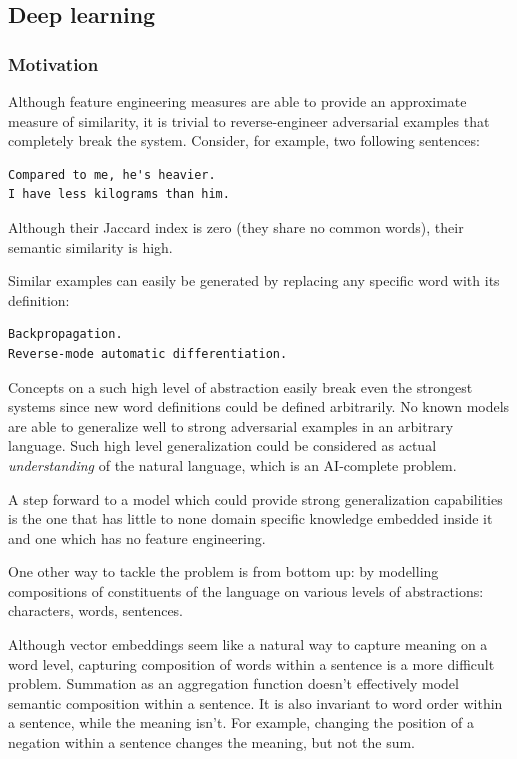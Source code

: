 \documentclass[10pt, a4paper]{article}
\begin{document}
\subsection{Deep learning}

\subsubsection{Motivation}
Although feature engineering measures are able to provide an approximate measure of similarity, it is trivial to reverse-engineer adversarial examples that completely break the system.
Consider, for example, two following sentences:

\begin{lstlisting}
Compared to me, he's heavier.
I have less kilograms than him.
\end{lstlisting}

Although their Jaccard index is zero (they share no common words), their semantic similarity is high.

Similar examples can easily be generated by replacing any specific word with its definition:
\begin{lstlisting}
Backpropagation.
Reverse-mode automatic differentiation.
\end{lstlisting}

Concepts on a such high level of abstraction easily break even the strongest systems since new word definitions could be defined arbitrarily.
No known models are able to generalize well to strong adversarial examples in an arbitrary language. 
Such high level generalization could be considered as actual \textit{understanding} of the natural language, which is an AI-complete problem.

A step forward to a model which could provide strong generalization capabilities is the one that has little to none domain specific knowledge embedded inside it and one which has no feature engineering.

One other way to tackle the problem is from bottom up: by modelling compositions of constituents of the language on various levels of abstractions: characters, words, sentences.

Although vector embeddings seem like a natural way to capture meaning on a word level, capturing composition of words within a sentence is a more difficult problem.
Summation as an aggregation function doesn't effectively model semantic composition within a sentence.
It is also invariant to word order within a sentence, while the meaning isn't.
For example, changing the position of a negation within a sentence changes the meaning, but not the sum.
\end{document}
